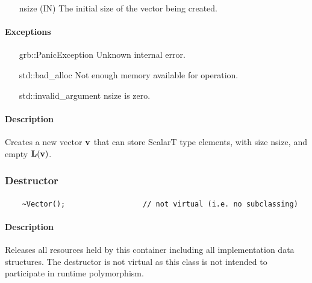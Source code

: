 {\begin{itemize}[leftmargin=1.1in]
    \item[{\sf nsize}] ({\sf IN}) The initial size of the vector being created.
\end{itemize}

\paragraph{Exceptions}

\begin{itemize}[leftmargin=2.1in]
    \item[{\sf grb::PanicException}]   Unknown internal error.
    \item[{\sf std::bad\_alloc}]        Not enough memory available for operation.
    \item[{\sf std::invalid\_argument}] {\sf nsize} is zero.
\end{itemize}

\paragraph{Description}

Creates a new vector ${\bf v}$ that can store {\sf ScalarT} type elements, with size {\sf nsize}, 
and empty $\mathbf{L}({\bf v})$.


\subsubsection{Destructor}

\paragraph{\syntax}

\begin{verbatim}
    ~Vector();                  // not virtual (i.e. no subclassing)
\end{verbatim}

\paragraph{Description}

Releases all resources held by this container including all implementation data structures.
The destructor is not virtual as this class is not intended to participate in runtime polymorphism.

}
